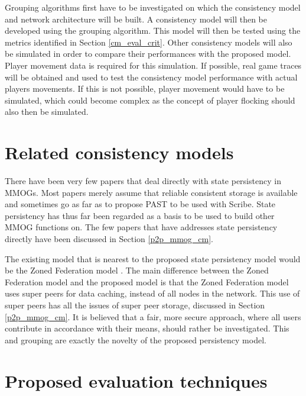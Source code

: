 \documentclass[journal,oneside,a4paper,onecolumn]{IEEEtran}
\begin{document}
Grouping algorithms first have to be investigated on which the consistency model and network architecture will be built. A consistency model will then be developed using the grouping algorithm. This model will then be tested using the metrics identified in Section \ref{cm_eval_crit}. Other consistency models will also be simulated in order to compare their performances with the proposed model. Player movement data is required for this simulation. If possible, real game traces will be obtained and used to test the consistency model performance with actual players movements. If this is not possible, player movement would have to be simulated, which could become complex as the concept of player flocking should also then be simulated.

\section{Related consistency models}
\label{related_cm}

There have been very few papers that deal directly with state persistency in MMOGs. Most papers merely assume that reliable consistent storage is available and sometimes go as far as to propose PAST to be used with Scribe. State persistency has thus far been regarded as a basis to be used to build other MMOG functions on. The few papers that have addresses state persistency directly have been discussed in Section \ref{p2p_mmog_cm}.


The existing model that is nearest to the proposed state persistency model would be the Zoned Federation model \cite{zoned_federation}. The main difference between the Zoned Federation model and the proposed model is that the Zoned Federation model uses super peers for data caching, instead of all nodes in the network. This use of super peers has all the issues of super peer storage, discussed in Section \ref{p2p_mmog_cm}. It is believed that a fair, more secure approach, where all users contribute in accordance with their means, should rather be investigated. This and grouping are exactly the novelty of the proposed persistency model.

\section{Proposed evaluation techniques}
\label{evaluation_techniques}
\end{document}

